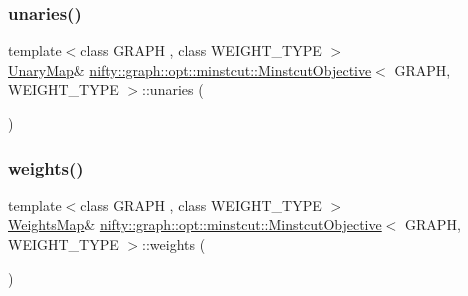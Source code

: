 \mbox{\label{classnifty_1_1graph_1_1opt_1_1minstcut_1_1MinstcutObjective_a4cc8cdadf8cf764f294e941d76cf8923}} 
\subsubsection{\texorpdfstring{unaries()}{unaries()}\hspace{0.1cm}{\footnotesize\ttfamily [2/2]}}
{\footnotesize\ttfamily template$<$class G\+R\+A\+PH , class W\+E\+I\+G\+H\+T\+\_\+\+T\+Y\+PE $>$ \\
\hyperlink{classnifty_1_1graph_1_1opt_1_1minstcut_1_1MinstcutObjective_a1662c8902f85cd5d0aa046c5657ee0f2}{Unary\+Map}\& \hyperlink{classnifty_1_1graph_1_1opt_1_1minstcut_1_1MinstcutObjective}{nifty\+::graph\+::opt\+::minstcut\+::\+Minstcut\+Objective}$<$ G\+R\+A\+PH, W\+E\+I\+G\+H\+T\+\_\+\+T\+Y\+PE $>$\+::unaries (\begin{DoxyParamCaption}{ }\end{DoxyParamCaption})\hspace{0.3cm}{\ttfamily [inline]}}

\mbox{\label{classnifty_1_1graph_1_1opt_1_1minstcut_1_1MinstcutObjective_af20ea050d5f17a80c93df2b3f932c267}} 
\subsubsection{\texorpdfstring{weights()}{weights()}\hspace{0.1cm}{\footnotesize\ttfamily [1/2]}}
{\footnotesize\ttfamily template$<$class G\+R\+A\+PH , class W\+E\+I\+G\+H\+T\+\_\+\+T\+Y\+PE $>$ \\
\hyperlink{classnifty_1_1graph_1_1opt_1_1minstcut_1_1MinstcutObjective_afba077d00b3dff86d2b482c1fb88344b}{Weights\+Map}\& \hyperlink{classnifty_1_1graph_1_1opt_1_1minstcut_1_1MinstcutObjective}{nifty\+::graph\+::opt\+::minstcut\+::\+Minstcut\+Objective}$<$ G\+R\+A\+PH, W\+E\+I\+G\+H\+T\+\_\+\+T\+Y\+PE $>$\+::weights (\begin{DoxyParamCaption}{ }\end{DoxyParamCaption})\hspace{0.3cm}{\ttfamily [inline]}}

